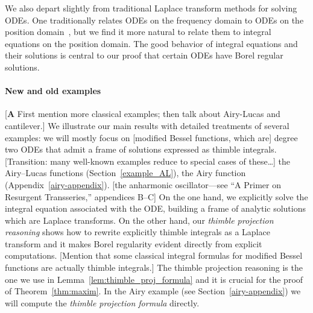 \documentclass{article}
\newcommand{\fracderiv}[3]{\partial^{#1}_{#2, #3}}
\newcommand*{\defeq}{\mathrel{\vcenter{\baselineskip0.5ex \lineskiplimit0pt
                     \hbox{\scriptsize.}\hbox{\scriptsize.}}}%
                     =}
\theoremstyle{definition}
\theoremstyle{plain}
\newenvironment{todo}{\color{Coral}}{\color{black}}
\newenvironment{draft}{\color{SlateBlue}}{\color{black}}
\begin{document}
We also depart slightly from traditional Laplace transform methods for solving ODEs. One traditionally relates ODEs on the frequency domain to ODEs on the position domain~\cite{braaksma2006laplace,laplace-tfm}, but we find it more natural to relate them to integral equations on the position domain. The good behavior of integral equations and their solutions is central to our proof that certain ODEs have Borel regular solutions.
%
\begin{draft}
\paragraph{New and old examples}
%
\begin{todo}[\textbf{A} First mention more classical examples; then talk about Airy-Lucas and cantilever.]\end{todo} We illustrate our main results with detailed treatments of several examples: we will mostly focus on [modified Bessel functions, which are] degree two ODEs that admit a frame of solutions expressed as thimble integrals. \begin{todo}[Transition: many well-known examples reduce to special cases of these\ldots]\end{todo} the Airy--Lucas functions (Section~\ref{example_AL}), the Airy function (Appendix~\ref{airy-appendix}). \begin{todo}[the anharmonic oscillator---see ``A Primer on Resurgent Transseries,'' appendices B--C]\end{todo} On the one hand, we explicitly solve the integral equation associated with the ODE, building a frame of analytic solutions which are Laplace transforms. On the other hand, our \textit{thimble projection reasoning} shows how to rewrite explicitly thimble integrals as a Laplace transform and it makes Borel regularity evident directly from explicit computations. \begin{todo}[Mention that some classical integral formulas for modified Bessel functions are actually thimble integrals.]\end{todo} The thimble projection reasoning is the one we use in Lemma~\ref{lem:thimble_proj_formula} and it is crucial for the proof of Theorem~\ref{thm:maxim}. In the Airy example (see Section~\ref{airy-appendix}) we will compute the \textit{thimble projection formula} directly.%


\end{draft}
\end{document}
